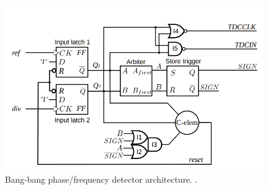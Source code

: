 \begin{figure}[h]
	\centering
	\includegraphics[scale=0.35]{../shan_bb_pd}
	\caption{Bang-bang phase/frequency detector architecture. \cite{shan2014phd}.}
	\label{fig:shan_bb_pd}
\end{figure}

